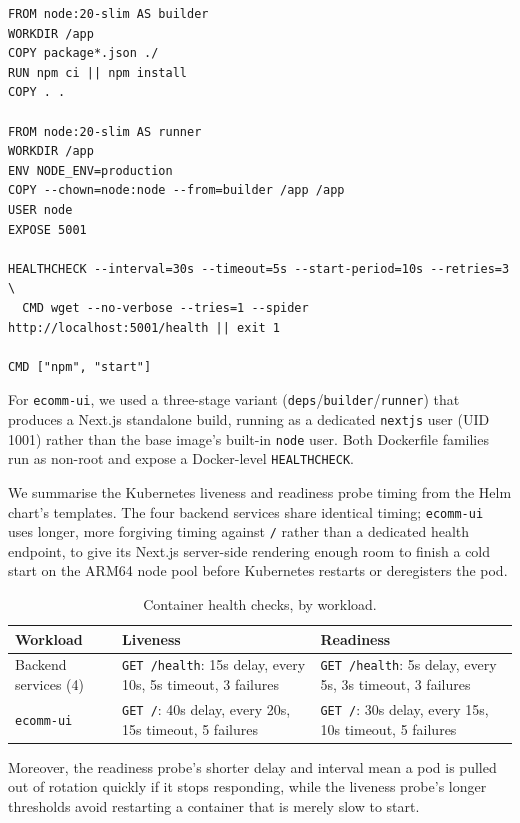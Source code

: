 \begin{lstlisting}[language={}, caption={\texttt{auth-service/Dockerfile}}]
FROM node:20-slim AS builder
WORKDIR /app
COPY package*.json ./
RUN npm ci || npm install
COPY . .

FROM node:20-slim AS runner
WORKDIR /app
ENV NODE_ENV=production
COPY --chown=node:node --from=builder /app /app
USER node
EXPOSE 5001

HEALTHCHECK --interval=30s --timeout=5s --start-period=10s --retries=3 \
  CMD wget --no-verbose --tries=1 --spider http://localhost:5001/health || exit 1

CMD ["npm", "start"]
\end{lstlisting}

For \texttt{ecomm-ui}, we used a three-stage variant (\texttt{deps}/\texttt{builder}/\texttt{runner})
that produces a Next.js standalone build, running as a dedicated \texttt{nextjs}
user (UID 1001) rather than the base image's built-in \texttt{node} user. Both
Dockerfile families run as non-root and expose a Docker-level
\texttt{HEALTHCHECK}.

We summarise the Kubernetes liveness and readiness probe timing
from the Helm chart's templates. The four backend services share identical timing;
\texttt{ecomm-ui} uses longer, more forgiving timing against \texttt{/} rather than a
dedicated health endpoint, to give its Next.js server-side rendering enough room to
finish a cold start on the ARM64 node pool before Kubernetes restarts or
deregisters the pod.

\begin{table}[H]
\centering
\caption{Container health checks, by workload.}
\label{tab:health-probes}
\small
\begin{tabularx}{\textwidth}{>{\raggedright\arraybackslash}p{2.6cm}
                >{\raggedright\arraybackslash}X X}
\toprule
\textbf{Workload} & \textbf{Liveness} & \textbf{Readiness} \\
\midrule
Backend services (4) & \texttt{GET /health}: 15s delay, every 10s, 5s timeout, 3 failures & \texttt{GET /health}: 5s delay, every 5s, 3s timeout, 3 failures \\
\texttt{ecomm-ui} & \texttt{GET /}: 40s delay, every 20s, 15s timeout, 5 failures & \texttt{GET /}: 30s delay, every 15s, 10s timeout, 5 failures \\
\bottomrule
\end{tabularx}
\end{table}

Moreover, the readiness probe's shorter delay and interval mean a pod is pulled out of
rotation quickly if it stops responding, while the liveness probe's longer
thresholds avoid restarting a container that is merely slow to start.

